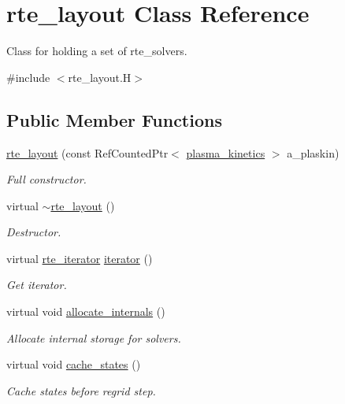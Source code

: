 \hypertarget{classrte__layout}{}\section{rte\+\_\+layout Class Reference}
\label{classrte__layout}


Class for holding a set of rte\+\_\+solvers.  




{\ttfamily \#include $<$rte\+\_\+layout.\+H$>$}

\subsection*{Public Member Functions}
\begin{DoxyCompactItemize}
\item 
\hyperlink{classrte__layout_a752fa5a571d2cc9bfca284d8adbbe2ff}{rte\+\_\+layout} (const Ref\+Counted\+Ptr$<$ \hyperlink{classplasma__kinetics}{plasma\+\_\+kinetics} $>$ a\+\_\+plaskin)
\begin{DoxyCompactList}\small\item\em Full constructor. \end{DoxyCompactList}\item 
virtual \hyperlink{classrte__layout_ad867a7c1777428a64d954d6766d53464}{$\sim$rte\+\_\+layout} ()
\begin{DoxyCompactList}\small\item\em Destructor. \end{DoxyCompactList}\item 
virtual \hyperlink{classrte__iterator}{rte\+\_\+iterator} \hyperlink{classrte__layout_ac7b3a0f3bd8ac0e4b6cf0dba42b67c84}{iterator} ()
\begin{DoxyCompactList}\small\item\em Get iterator. \end{DoxyCompactList}\item 
virtual void \hyperlink{classrte__layout_aec4addf191c6d4651c02adf40a4e1023}{allocate\+\_\+internals} ()
\begin{DoxyCompactList}\small\item\em Allocate internal storage for solvers. \end{DoxyCompactList}\item 
virtual void \hyperlink{classrte__layout_aecacfd47cdb70ed85b0712a14e80d475}{cache\+\_\+states} ()
\begin{DoxyCompactList}\small\item\em Cache states before regrid step. \end{DoxyCompactList}\item 

\end{DoxyCompactItemize}
